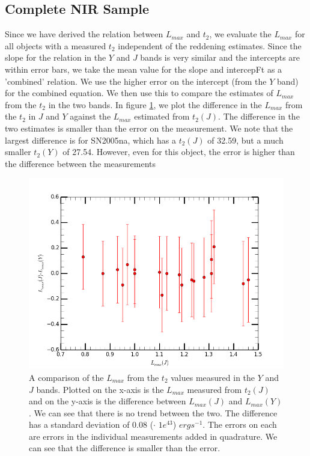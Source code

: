 \subsection{Complete NIR Sample}
Since we have derived the relation between $L_{max}$ and $t_2$, we evaluate the $L_{max}$ for all objects with a measured $t_2$ independent of the reddening estimates.
Since the slope for the relation in the $Y$ and $J$ bands is very similar and the intercepts are within error bars, we take the mean value for the slope and intercepFt as a 'combined' relation. We use the higher error on the intercept (from the $Y$ band) for the combined equation. We then use this to compare the estimates of $L_{max}$ from the $t_2$ in the two bands. In figure \ref{fig:yjcomp}, we plot the difference in the $L_{max}$ from the $t_2$ in $J$ and $Y$ against the $L_{max}$ estimated from $t_2(J)$. The difference in the two estimates is smaller than the error on the measurement. We note that the largest difference is for SN2005na, which has a $t_2(J)$ of 32.59, but a much smaller $t_2(Y)$ of 27.54. However, even for this object, the error is higher than the difference between the measurements   


\begin{figure}
\includegraphics[width=.5\textwidth, height=0.25\textheight, trim= 0 30 0 30]{../plot_rel/lbol_comp_yj.png}


\caption{A comparison of the $L_{max}$ from the $t_2$ values measured in the $Y$ and $J$ bands. Plotted on the x-axis is the $L_{max}$ measured from $t_2(J)$ and on the y-axis is the difference between $L_{max}(J)$ and $L_{max}(Y)$. We can see that there is no trend between the two. The difference has a standard deviation of 0.08 ($\cdot$ $1e^{43}$) $erg s^{-1}$. The errors on each are errors in the individual measurements added in quadrature. We can see that the difference is smaller than the error. }
\label{fig:yjcomp}
\end{figure}

